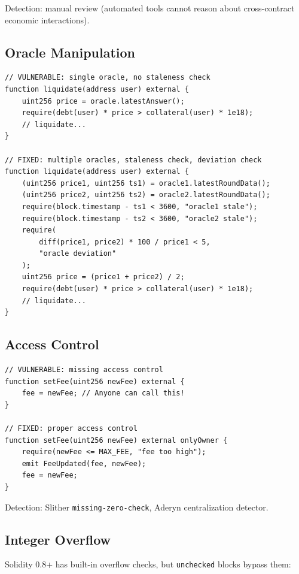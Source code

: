 Detection: manual review (automated tools cannot reason about cross-contract economic interactions).

\subsection{Oracle Manipulation}

\begin{lstlisting}[language=Solidity,caption={Oracle manipulation defense}]
// VULNERABLE: single oracle, no staleness check
function liquidate(address user) external {
    uint256 price = oracle.latestAnswer();
    require(debt(user) * price > collateral(user) * 1e18);
    // liquidate...
}

// FIXED: multiple oracles, staleness check, deviation check
function liquidate(address user) external {
    (uint256 price1, uint256 ts1) = oracle1.latestRoundData();
    (uint256 price2, uint256 ts2) = oracle2.latestRoundData();
    require(block.timestamp - ts1 < 3600, "oracle1 stale");
    require(block.timestamp - ts2 < 3600, "oracle2 stale");
    require(
        diff(price1, price2) * 100 / price1 < 5,
        "oracle deviation"
    );
    uint256 price = (price1 + price2) / 2;
    require(debt(user) * price > collateral(user) * 1e18);
    // liquidate...
}
\end{lstlisting}

\subsection{Access Control}

\begin{lstlisting}[language=Solidity,caption={Access control vulnerability and fix}]
// VULNERABLE: missing access control
function setFee(uint256 newFee) external {
    fee = newFee; // Anyone can call this!
}

// FIXED: proper access control
function setFee(uint256 newFee) external onlyOwner {
    require(newFee <= MAX_FEE, "fee too high");
    emit FeeUpdated(fee, newFee);
    fee = newFee;
}
\end{lstlisting}

Detection: Slither \texttt{missing-zero-check}, Aderyn centralization detector.

\subsection{Integer Overflow}

Solidity 0.8+ has built-in overflow checks, but \texttt{unchecked} blocks bypass them:


